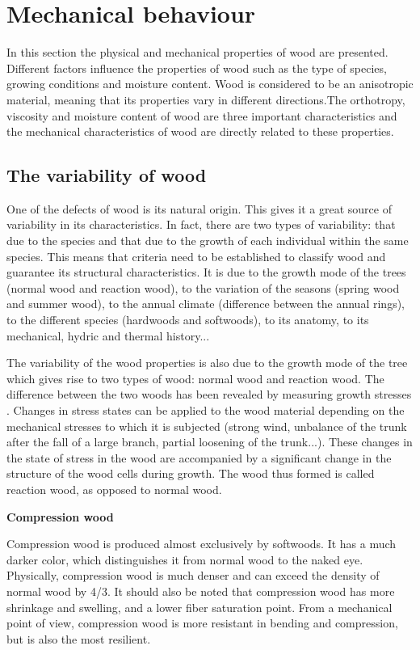 \section{Mechanical behaviour}

In this section the physical and mechanical properties of wood are presented. Different factors influence the properties of wood such as the type of species, growing conditions and moisture content. Wood is considered to be an anisotropic material, meaning that its properties vary in different directions.The orthotropy, viscosity and moisture content of wood are three important characteristics and the mechanical characteristics of wood are directly related to these properties.

\subsection{The variability of wood}

One of the defects of wood is its natural origin. This gives it a great source of variability in its characteristics. In fact, there are two types of variability: that due to the species and that due to the growth of each individual within the same species. This means that criteria need to be established to classify wood and guarantee its structural characteristics. It is due to the growth mode of the trees (normal wood and reaction wood), to the variation of the seasons (spring wood and summer wood), to the annual climate (difference between the annual rings), to the different species (hardwoods and softwoods), to its anatomy, to its mechanical, hydric and thermal history...

The variability of the wood properties is also due to the growth mode of the tree which gives rise to two types of wood: normal wood and reaction wood. The difference between the two woods has been revealed by measuring growth stresses \cite{Reference7}. Changes in stress states can be applied to the wood material depending on the mechanical stresses to which it is subjected (strong wind, unbalance of the trunk after the fall of a large branch, partial loosening of the trunk...). These changes in the state of stress in the wood are accompanied by a significant change in the structure of the wood cells during growth. The wood thus formed is called reaction wood, as opposed to normal wood.

\smallskip

\textbf{Compression wood}

Compression wood is produced almost exclusively by softwoods. It has a much darker color, which distinguishes it from normal wood to the naked eye. Physically, compression wood is much denser and can exceed the density of normal wood by 4/3. It should also be noted that compression wood has more shrinkage and swelling, and a lower fiber saturation point. From a mechanical point of view, compression wood is more resistant in bending and compression, but is also the most resilient.

